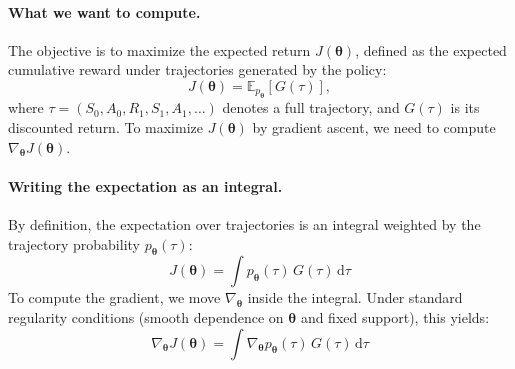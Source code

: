 \paragraph{What we want to compute.}
The objective is to maximize the expected return $J(\boldsymbol{\theta})$,
defined as the expected cumulative reward under trajectories generated by the
policy:
\begin{equation}
    J(\boldsymbol{\theta}) = \mathbb{E}_{p_{\boldsymbol{\theta}}} \left[ G(\tau) \right],
\end{equation}
where $\tau = (S_0, A_0, R_1, S_1, A_1, \ldots)$ denotes a full trajectory,
and $G(\tau)$ is its discounted return. To maximize $J(\boldsymbol{\theta})$
by gradient ascent, we need to compute $\nabla_{\boldsymbol{\theta}}
J(\boldsymbol{\theta})$.

\paragraph{Writing the expectation as an integral.}
By definition, the expectation over trajectories is an integral weighted by
the trajectory probability $p_{\boldsymbol{\theta}}(\tau)$:
\begin{equation}
    J(\boldsymbol{\theta})
    = \int p_{\boldsymbol{\theta}}(\tau) \, G(\tau) \, \mathrm{d}\tau
\end{equation}
To compute the gradient, we move $\nabla_{\boldsymbol{\theta}}$
inside the integral. Under standard regularity conditions (smooth dependence
on $\boldsymbol{\theta}$ and fixed support), this yields:
\begin{equation}
    \nabla_{\boldsymbol{\theta}} J(\boldsymbol{\theta})
    = \int \nabla_{\boldsymbol{\theta}} p_{\boldsymbol{\theta}}(\tau)
    \, G(\tau) \, \mathrm{d}\tau
\end{equation}

